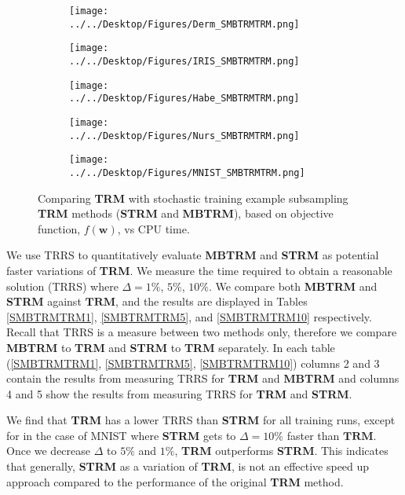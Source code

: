 \documentclass[letterpaper,12pt,titlepage,oneside,final]{book}
\begin{document}
	\begin{figure}
		\centering
		\begin{subfigure}{.45\textwidth}
			\texttt{[image: ../../Desktop/Figures/Derm\_SMBTRMTRM.png]}
		\end{subfigure}%
		\begin{subfigure}{.45\textwidth}
			\texttt{[image: ../../Desktop/Figures/IRIS\_SMBTRMTRM.png]}
		\end{subfigure}
		\begin{subfigure}{.45\textwidth}
			\texttt{[image: ../../Desktop/Figures/Habe\_SMBTRMTRM.png]}
		\end{subfigure}
		\begin{subfigure}{.45\textwidth}
			\texttt{[image: ../../Desktop/Figures/Nurs\_SMBTRMTRM.png]}
		\end{subfigure}
		\begin{subfigure}{.45\textwidth}
			\texttt{[image: ../../Desktop/Figures/MNIST\_SMBTRMTRM.png]}
		\end{subfigure}
		\caption{Comparing \textbf{TRM} with stochastic training example subsampling \textbf{TRM} methods (\textbf{STRM} and \textbf{MBTRM}), based on objective function, $f(\mathbf{w})$, vs CPU time.}
		\label{figure:SMBTRMTRM}
	\end{figure}
	
	
	We use TRRS to quantitatively evaluate \textbf{MBTRM} and \textbf{STRM} as potential faster variations of \textbf{TRM}. We measure the time required to obtain a reasonable solution (TRRS) where $\Delta = 1\%$, $5\%$, $10\%$. We compare both \textbf{MBTRM} and \textbf{STRM} against $\mathbf{TRM}$, and the results are displayed in Tables \ref{SMBTRMTRM1}, \ref{SMBTRMTRM5}, and \ref{SMBTRMTRM10} respectively. Recall that TRRS is a measure between two methods only, therefore we compare \textbf{MBTRM} to \textbf{TRM} and \textbf{STRM} to \textbf{TRM} separately. In each table (\ref{SMBTRMTRM1}, \ref{SMBTRMTRM5}, \ref{SMBTRMTRM10}) columns 2 and 3 contain the results from measuring TRRS for \textbf{TRM} and \textbf{MBTRM} and columns 4 and 5 show the results from measuring TRRS for \textbf{TRM} and \textbf{STRM}.
	
	We find that \textbf{TRM} has a lower TRRS than \textbf{STRM} for all training runs, except for in the case of MNIST where \textbf{STRM} gets to $\Delta = 10\%$ faster than $\textbf{TRM}$. Once we decrease $\Delta$ to $5\%$ and $1\%$, \textbf{TRM} outperforms \textbf{STRM}. This indicates that generally, \textbf{STRM} as a variation of \textbf{TRM}, is not an effective speed up approach compared to the performance of the original \textbf{TRM} method.
	
\end{document}
